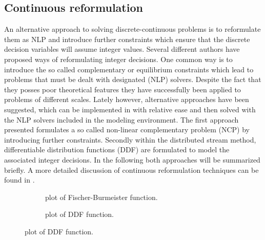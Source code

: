     \subsection{Continuous reformulation}
    \label{sec:opt:theory:continuous}
    An alternative approach to solving discrete-continuous problems is to reformulate them as NLP
    and introduce further constraints which ensure that the discrete decision variables will assume integer values.
    Several different authors have proposed ways of reformulating integer decisions. One common way is to introduce
    the so called complementary or equilibrium constraints which lead to problems that must be dealt with designated
    (NLP) solvers. Despite the fact that they posses poor theoretical features they have successfully been applied
    to problems of different scales. Lately however, alternative approaches have been suggested, which can be implemented
    in \gproms with relative ease and then solved with the NLP solvers included in the modeling environment.
    The first approach presented formulates a so called non-linear complementary problem (NCP) by introducing
    further constraints. Secondly within the distributed stream method, differentiable distribution functions (DDF)
    are formulated to model the associated integer decisions. In the following both approaches will be summarized briefly.
    A more detailed discussion of continuous reformulation techniques can be found in \cite{Stein.2004}.
    \begin{figure}
        \scriptsize
        \center
        \begin{subfigure}{0.48\textwidth}
            
            \caption{plot of Fischer-Burmeister function.}
            \label{fig:FB_plot}
        \end{subfigure}
            \begin{subfigure}{0.48\textwidth}
            
            \caption{plot of DDF function.}
            \label{fig:DDF_plot}
        \end{subfigure}
    \end{figure}

